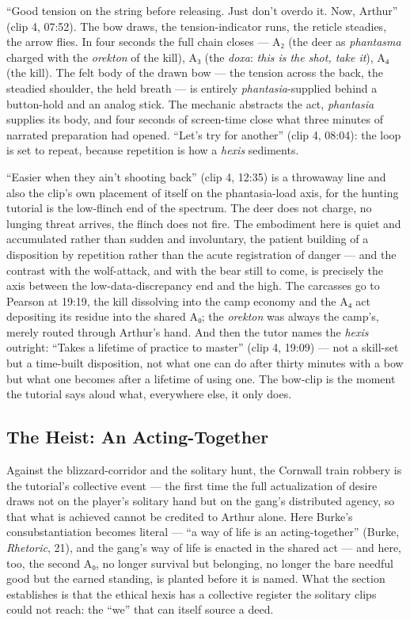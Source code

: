 \documentclass{article}
\begin{document}
``Good tension on the string before releasing. Just don't overdo it. Now, Arthur'' (clip 4, 07:52). The bow draws, the tension-indicator runs, the reticle steadies, the arrow flies. In four seconds the full chain closes — A₂ (the deer as \textit{phantasma} charged with the \textit{orekton} of the kill), A₃ (the \textit{doxa}: \textit{this is the shot, take it}), A₄ (the kill). The felt body of the drawn bow — the tension across the back, the steadied shoulder, the held breath — is entirely \textit{phantasia}-supplied behind a button-hold and an analog stick. The mechanic abstracts the act, \textit{phantasia} supplies its body, and four seconds of screen-time close what three minutes of narrated preparation had opened. ``Let's try for another'' (clip 4, 08:04): the loop is set to repeat, because repetition is how a \textit{hexis} sediments.

``Easier when they ain't shooting back'' (clip 4, 12:35) is a throwaway line and also the clip's own placement of itself on the phantasia-load axis, for the hunting tutorial is the low-flinch end of the spectrum. The deer does not charge, no lunging threat arrives, the flinch does not fire. The embodiment here is quiet and accumulated rather than sudden and involuntary, the patient building of a disposition by repetition rather than the acute registration of danger — and the contrast with the wolf-attack, and with the bear still to come, is precisely the axis between the low-data-discrepancy end and the high. The carcasses go to Pearson at 19:19, the kill dissolving into the camp economy and the A₄ act depositing its residue into the shared A₀; the \textit{orekton} was always the camp's, merely routed through Arthur's hand. And then the tutor names the \textit{hexis} outright: ``Takes a lifetime of practice to master'' (clip 4, 19:09) — not a skill-set but a time-built disposition, not what one can do after thirty minutes with a bow but what one becomes after a lifetime of using one. The bow-clip is the moment the tutorial says aloud what, everywhere else, it only does.

\bigskip

\subsection*{The Heist: An Acting-Together}

Against the blizzard-corridor and the solitary hunt, the Cornwall train robbery is the tutorial's collective event — the first time the full actualization of desire draws not on the player's solitary hand but on the gang's distributed agency, so that what is achieved cannot be credited to Arthur alone. Here Burke's consubstantiation becomes literal — ``a way of life is an acting-together'' (Burke, \textit{Rhetoric}, 21), and the gang's way of life is enacted in the shared act — and here, too, the second A₀, no longer survival but belonging, no longer the bare needful good but the earned standing, is planted before it is named. What the section establishes is that the ethical hexis has a collective register the solitary clips could not reach: the ``we'' that can itself source a deed.
\end{document}
